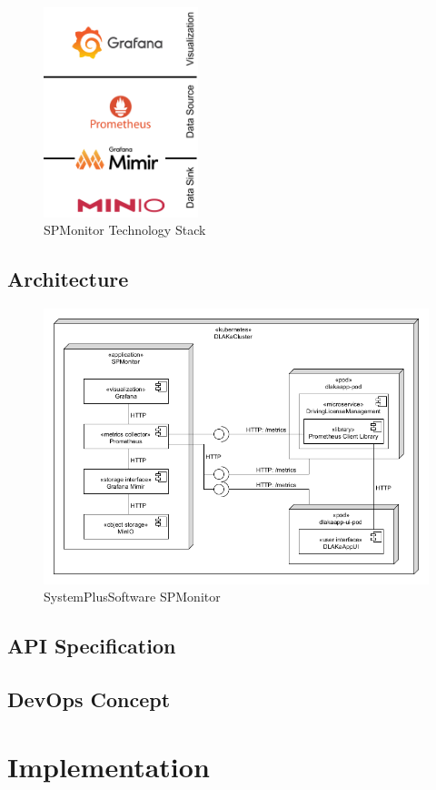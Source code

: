 \begin{figure}
	\centering
	\includegraphics[width=0.4\textwidth]{figures/spmonitor_tech_stack.png}
	\caption{SPMonitor Technology Stack}
	\label{fig:spmonitor_tech_stack}
\end{figure}

\subsection{Architecture}


\begin{figure}[h]
	\centering
	\includegraphics[width=\textwidth]{figures/sps_spmonitor.png}
	\caption{SystemPlusSoftware SPMonitor}
	\label{fig:sps_spmonitor}
\end{figure}

\subsection{API Specification}

\subsection{DevOps Concept}

\section{Implementation}